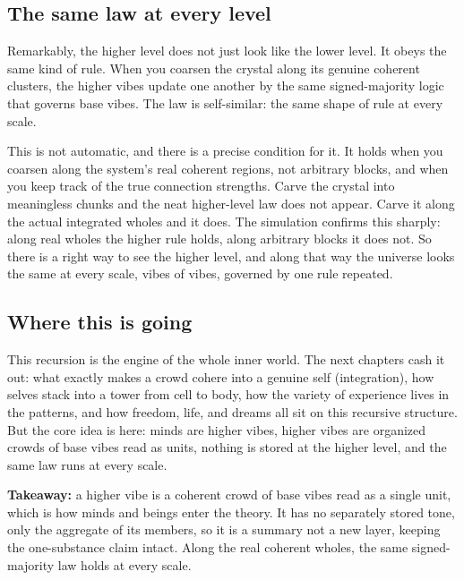 \subsection{The same law at every level}

Remarkably, the higher level does not just look like the lower level. It obeys the same kind of rule. When you coarsen the crystal along its genuine coherent clusters, the higher vibes update one another by the same signed-majority logic that governs base vibes. The law is self-similar: the same shape of rule at every scale.

This is not automatic, and there is a precise condition for it. It holds when you coarsen along the system's real coherent regions, not arbitrary blocks, and when you keep track of the true connection strengths. Carve the crystal into meaningless chunks and the neat higher-level law does not appear. Carve it along the actual integrated wholes and it does. The simulation confirms this sharply: along real wholes the higher rule holds, along arbitrary blocks it does not. So there is a right way to see the higher level, and along that way the universe looks the same at every scale, vibes of vibes, governed by one rule repeated.

\subsection{Where this is going}

This recursion is the engine of the whole inner world. The next chapters cash it out: what exactly makes a crowd cohere into a genuine self (integration), how selves stack into a tower from cell to body, how the variety of experience lives in the patterns, and how freedom, life, and dreams all sit on this recursive structure. But the core idea is here: minds are higher vibes, higher vibes are organized crowds of base vibes read as units, nothing is stored at the higher level, and the same law runs at every scale.

\textbf{Takeaway:} a higher vibe is a coherent crowd of base vibes read as a single unit, which is how minds and beings enter the theory. It has no separately stored tone, only the aggregate of its members, so it is a summary not a new layer, keeping the one-substance claim intact. Along the real coherent wholes, the same signed-majority law holds at every scale.
